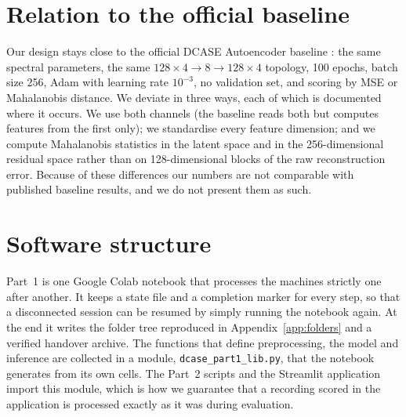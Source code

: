\section{Relation to the official baseline}
Our design stays close to the official DCASE Autoencoder baseline \cite{harada2023}: the same spectral parameters, the same $128\times4\to8\to128\times4$ topology, 100 epochs, batch size 256, Adam with learning rate $10^{-3}$, no validation set, and scoring by MSE or Mahalanobis distance. We deviate in three ways, each of which is documented where it occurs. We use both channels (the baseline reads both but computes features from the first only); we standardise every feature dimension; and we compute Mahalanobis statistics in the latent space and in the 256-dimensional residual space rather than on 128-dimensional blocks of the raw reconstruction error. Because of these differences our numbers are not comparable with published baseline results, and we do not present them as such.

\section{Software structure}
Part~1 is one Google Colab notebook that processes the machines strictly one after another. It keeps a state file and a completion marker for every step, so that a disconnected session can be resumed by simply running the notebook again. At the end it writes the folder tree reproduced in Appendix~\ref{app:folders} and a verified handover archive. The functions that define preprocessing, the model and inference are collected in a module, \texttt{dcase\_part1\_lib.py}, that the notebook generates from its own cells. The Part~2 scripts and the Streamlit application import this module, which is how we guarantee that a recording scored in the application is processed exactly as it was during evaluation.
